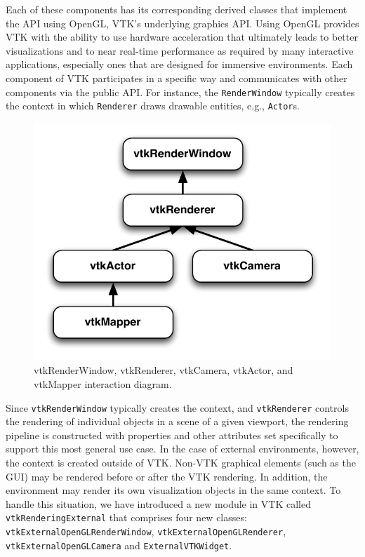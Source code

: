 Each of these components has its corresponding derived classes that implement the API using OpenGL, VTK's underlying graphics API.
Using OpenGL provides VTK with the ability to use hardware acceleration that ultimately leads to better visualizations and to near real-time performance as required by many interactive applications, especially ones that are designed for immersive environments.
Each component of VTK participates in a specific way and communicates with other components via the public API.
For instance, the \texttt{RenderWindow} typically creates the context in which
\texttt{Renderer} draws drawable entities, e.g., \texttt{Actor}s.

\begin{figure}[h!]
  \centering
  \includegraphics[width=0.5\linewidth]{images/vtkRenderPipeline.pdf}
  \caption{vtkRenderWindow, vtkRenderer, vtkCamera, vtkActor, and vtkMapper interaction diagram.}
  \label{fig:vtkRenderPipeline}
\end{figure}

Since \texttt{vtkRenderWindow} typically creates the context, and \texttt{vtkRenderer} controls the rendering of individual objects in a scene of a given viewport, the rendering pipeline is constructed with properties and other attributes set specifically to support this most general use case.
In the case of external environments, however, the context is created outside of VTK. Non-VTK graphical elements (such as the GUI) may be rendered before or after the VTK rendering.
In addition, the environment may render its own visualization objects in the same context.
To handle this situation, we have introduced a new module in VTK called \texttt{vtkRenderingExternal} that comprises four new classes: \texttt{vtkExternalOpenGLRenderWindow}, \texttt{vtkExternalOpenGLRenderer}, \texttt{vtkExternalOpenGLCamera} and \texttt{ExternalVTKWidget}. 

